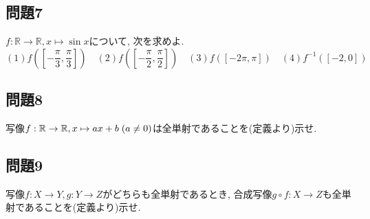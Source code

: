 \documentclass[a4j,dvipdfmx]{jsarticle}
\begin{document}
    \subsection*{問題7}
        $f:\mathbb{R}\to\mathbb{R},x\mapsto \sin x$について, 次を求めよ. 
        \begin{equation*}
            (1)f\left([-\frac{\pi}{3},\frac{\pi}{3}]\right)\quad (2)f\left([-\frac{\pi}{2},\frac{\pi}{2}]\right)\quad (3)f\left([-2\pi,\pi]\right)\quad (4)f^{-1}([-2,0])
        \end{equation*}
    \subsection*{問題8}
        写像$f:\mathbb{R}\to\mathbb{R}, x\mapsto ax+b\hspace{1mm}(a\neq 0)$は全単射であることを(定義より)示せ.
    \subsection*{問題9}
        写像$f:X\to Y,g:Y\to Z$がどちらも全単射であるとき, 合成写像$g\circ f:X\to Z$も全単射であることを(定義より)示せ.
\end{document}
